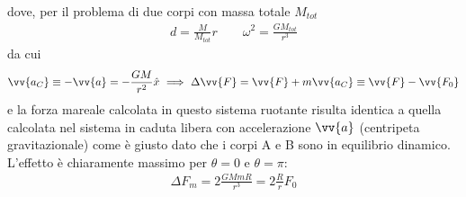 \documentclass[a4paper, oneside]{book}
\begin{document}
dove, per il problema di due corpi con massa totale $M_{tot}$ 
\begin{gather*}
    d = \frac{M}{M_{tot}}r \qquad \omega^{2} = \frac{GM_{tot}}{r^{3}}
\end{gather*}
da cui 
\begin{gather*}
    \vv{a_C} \equiv -\vv{a} = - \frac{GM}{r^{2}} \hat{x} \ \Longrightarrow \ \Delta \vv{F} = \vv{F} + m\vv{a_C} \equiv \vv{F} -\vv{F_0}        
\end{gather*}
e la forza mareale calcolata in questo sistema ruotante 
risulta identica a quella calcolata nel sistema in caduta libera con accelerazione
$\vv{a}$ (centripeta gravitazionale) come è giusto dato che i corpi A e B sono in equilibrio 
dinamico. L'effetto è chiaramente massimo per $\theta = 0$ e $\theta = \pi$:
\begin{gather*}
    \Delta F_m = 2\frac{GMmR}{r^{3}} = 2\frac{R}{r}F_0
\end{gather*}  
\end{document}
